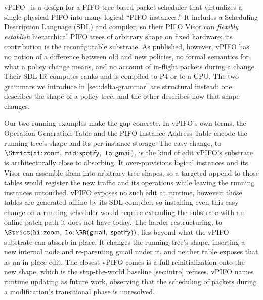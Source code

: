 vPIFO~\cite{vPIFO} is a design for a PIFO-tree-based packet scheduler that
virtualizes a single physical PIFO into many logical ``PIFO instances.''
It includes a Scheduling Description Language (SDL) and compiler, so their PIFO Visor can \emph{flexibly establish} hierarchical PIFO trees of arbitrary shape on fixed hardware; its contribution is the reconfigurable substrate.
As published, however, vPIFO has no notion of a difference between old and new policies, no formal semantics for what a policy change means, and no account of in-flight packets during a change.
Their SDL IR computes ranks and is compiled to P4 or to a CPU.
The two grammars we introduce in \cref{sec:delta-grammar} are structural instead: one describes the shape of a policy tree, and the other describes how that shape changes.

Our two running examples make the gap concrete.
In vPIFO's own terms, the Operation Generation Table and the PIFO Instance Address Table encode the running tree's shape and its per-instance storage.
The easy change, to \(\Strict(\mathtt{hi}{:}\,\textsf{zoom},\allowbreak\ \mathtt{mid}{:}\,\textsf{spotify},\allowbreak\ \mathtt{lo}{:}\,\textsf{gmail})\), is the kind of edit vPIFO's substrate is architecturally close to absorbing.
It over-provisions logical instances and its Visor can assemble them into arbitrary tree shapes, so a targeted append to those tables would register the new traffic and its operations while leaving the running instances untouched.
vPIFO exposes no such edit at runtime, however: those tables are generated offline by its SDL compiler, so installing even this easy change on a running scheduler would require extending the substrate with an online-patch path it does not have today.
The harder restructuring, to \(\Strict(\mathtt{hi}{:}\,\textsf{zoom},\allowbreak\ \mathtt{lo}{:}\,\RR(\textsf{gmail},\allowbreak\ \textsf{spotify}))\), lies beyond what the vPIFO substrate can absorb in place.
It changes the running tree's shape, inserting a new internal \RR{} node and re-parenting \textsf{gmail} under it, and neither table exposes that as an in-place edit.
The closest vPIFO comes is a full reinitialization onto the new shape, which is the stop-the-world baseline \cref{sec:intro} refuses.
vPIFO names runtime updating as future work, observing that the scheduling of packets during a modification's transitional phase is unresolved.



